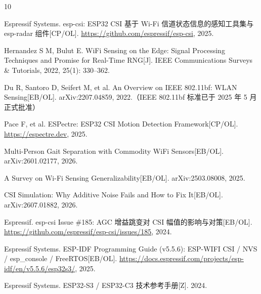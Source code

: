 \documentclass[eversion]{thesis-guet}
\begin{document}
\newpage
\fancyhf{}
\begin{thebibliography}{10}

Espressif Systems. esp-csi: ESP32 CSI 基于 Wi-Fi 信道状态信息的感知工具集与 esp-radar 组件[CP/OL].
\url{https://github.com/espressif/esp-csi}, 2025.

Hernandez S M, Bulut E. WiFi Sensing on the Edge: Signal Processing Techniques and
Promise for Real-Time RNG[J]. IEEE Communications Surveys \& Tutorials, 2022, 25(1): 330--362.

Du R, Santoro D, Seifert M, et al. An Overview on IEEE 802.11bf: WLAN Sensing[EB/OL].
arXiv:2207.04859, 2022.（IEEE 802.11bf 标准已于 2025 年 5 月正式批准）

Pace F, et al. ESPectre: ESP32 CSI Motion Detection Framework[CP/OL]. \url{https://espectre.dev}, 2025.

Multi-Person Gait Separation with Commodity WiFi Sensors[EB/OL]. arXiv:2601.02177, 2026.

A Survey on Wi-Fi Sensing Generalizability[EB/OL]. arXiv:2503.08008, 2025.

CSI Simulation: Why Additive Noise Fails and How to Fix It[EB/OL]. arXiv:2607.01882, 2026.

Espressif. esp-csi Issue \#185: AGC 增益跳变对 CSI 幅值的影响与对策[EB/OL].
\url{https://github.com/espressif/esp-csi/issues/185}, 2024.

Espressif Systems. ESP-IDF Programming Guide (v5.5.6): ESP-WIFI CSI / NVS / esp\_console /
FreeRTOS[EB/OL]. \url{https://docs.espressif.com/projects/esp-idf/en/v5.5.6/esp32s3/}, 2025.

Espressif Systems. ESP32-S3 / ESP32-C3 技术参考手册[Z]. 2024.

\end{thebibliography}

\normalfont
\end{document}
